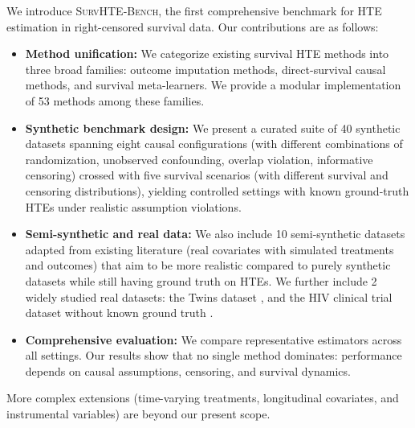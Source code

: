 We introduce \textsc{SurvHTE‐Bench}, the first comprehensive benchmark for HTE estimation in right-censored survival data.
Our contributions are as follows:
\begin{itemize}
    \item \textbf{Method unification:} We categorize existing survival HTE methods into three broad families: outcome imputation methods, direct-survival causal methods, and survival meta-learners.
We provide a modular implementation of 53 methods among these families.
    \item \textbf{Synthetic benchmark design:} We present a curated suite of 40 synthetic datasets spanning eight causal configurations (with different combinations of randomization, unobserved confounding, overlap violation, informative censoring) crossed with five survival scenarios (with different survival and censoring distributions), yielding controlled settings with known ground-truth HTEs under realistic assumption violations.
    \item \textbf{Semi-synthetic and real data:} We also include 10 semi-synthetic datasets adapted from existing literature (real covariates with simulated treatments and outcomes) that aim to be more realistic compared to purely synthetic datasets while still having ground truth on HTEs.
We further include 2 widely studied real datasets: the Twins dataset \citep{almond2005the}, and the HIV clinical trial dataset without known ground truth \citep{hammer1996atrial}.
    \item \textbf{Comprehensive evaluation:} We compare representative estimators across all settings.
Our results show that no single method dominates: performance depends on causal assumptions, censoring, and survival dynamics.
\end{itemize}

More complex extensions (time-varying treatments, longitudinal covariates, and instrumental variables) are beyond our present scope. 
